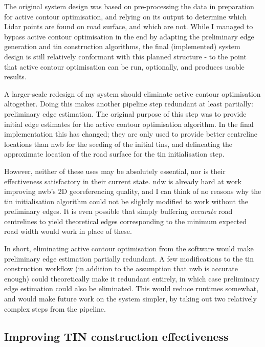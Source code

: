 The original system design was based on pre-processing the data in preparation for active contour optimisation, and relying on its output to determine which Lidar points are found on road surface, and which are not. While I managed to bypass active contour optimisation in the end by adapting the preliminary edge generation and \ac{tin} construction algorithms, the final (implemented) system design is still relatively conformant with this planned structure - to the point that active contour optimisation can be run, optionally, and produces usable results.

A larger-scale redesign of my system should eliminate active contour optimisation altogether. Doing this makes another pipeline step redundant at least partially: preliminary edge estimation. The original purpose of this step was to provide initial edge estimates for the active contour optimisation algorithm. In the final implementation this has changed; they are only used to provide better centreline locations than \ac{nwb} for the seeding of the initial \ac{tin}s, and delineating the approximate location of the road surface for the \ac{tin} initialisation step.

However, neither of these uses may be absolutely essential, nor is their effectiveness satisfactory in their current state. \ac{ndw} is already hard at work improving \ac{nwb}'s 2D georeferencing quality, and I can think of no reasons why the \ac{tin} initialisation algorithm could not be slightly modified to work without the preliminary edges. It is even possible that simply buffering \textit{accurate} road centrelines to yield theoretical edges corresponding to the minimum expected road width would work in place of these.

In short, eliminating active contour optimisation from the software would make preliminary edge estimation partially redundant. A few modifications to the \ac{tin} construction workflow (in addition to the assumption that \ac{nwb} is accurate enough) could theoretically make it redundant entirely, in which case preliminary edge estimation could also be eliminated. This would reduce runtimes somewhat, and would make future work on the system simpler, by taking out two relatively complex steps from the pipeline.

\subsection{Improving TIN construction effectiveness}
\label{sub:improvementstinconstruction}

